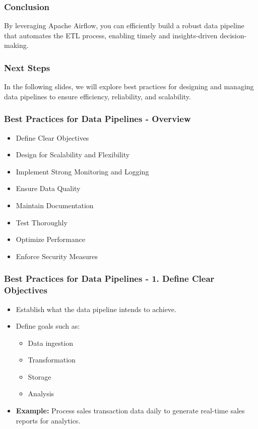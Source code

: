 \documentclass[aspectratio=169]{beamer}
\begin{document}
\begin{frame}
    \frametitle{Conclusion}
    By leveraging Apache Airflow, you can efficiently build a robust data pipeline that automates the ETL process, enabling timely and insights-driven decision-making.
\end{frame}

\begin{frame}
    \frametitle{Next Steps}
    In the following slides, we will explore best practices for designing and managing data pipelines to ensure efficiency, reliability, and scalability.
\end{frame}

\begin{frame}[fragile]
    \frametitle{Best Practices for Data Pipelines - Overview}
    \begin{itemize}
        \item Define Clear Objectives
        \item Design for Scalability and Flexibility
        \item Implement Strong Monitoring and Logging
        \item Ensure Data Quality
        \item Maintain Documentation
        \item Test Thoroughly
        \item Optimize Performance
        \item Enforce Security Measures
    \end{itemize}
\end{frame}

\begin{frame}[fragile]
    \frametitle{Best Practices for Data Pipelines - 1. Define Clear Objectives}
    \begin{itemize}
        \item Establish what the data pipeline intends to achieve.
        \item Define goals such as:
        \begin{itemize}
            \item Data ingestion
            \item Transformation
            \item Storage
            \item Analysis
        \end{itemize}
        \item \textbf{Example:} Process sales transaction data daily to generate real-time sales reports for analytics.
    \end{itemize}
\end{frame}
\end{document}
